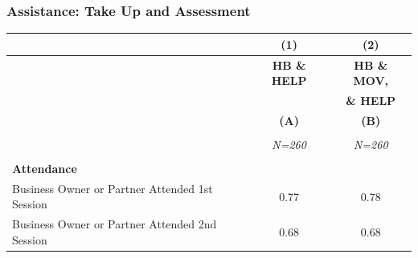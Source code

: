 \documentclass[hideothersubsections, usenames,dvipsnames,10pt]{beamer}
\begin{document}
\begin{frame}

\frametitle{Assistance: Take Up and Assessment}
{\scriptsize{\begin{table}[htbp]
  \centering
    \begin{tabular}{lcc}
    \hline
    & (1)   			& (2) 			\\
    \hline
   	& \textbf{HB \& HELP} 		& \textbf{HB \& MOV,}		 \\
  	& 							& \textbf{\& HELP}			 \\
   	& \textbf{(A)}   			& \textbf{(B)}   			\\
	&							&							 \\
   	& \textit{N=260} 			& \textit{N=260} 		\\
    \hline
          																				&       &      \\
    \multicolumn{1}{l}{\textbf{Attendance}} 											&       &        \\
    \multicolumn{1}{l}{    Business Owner or Partner Attended 1st Session} 				& 0.77  & 0.78  \\
    \multicolumn{1}{l}{    Business Owner or Partner Attended 2nd Session} 				& 0.68  & 0.68   \\

\end{tabular}
\end{table}}}
\end{frame}
\end{document}
